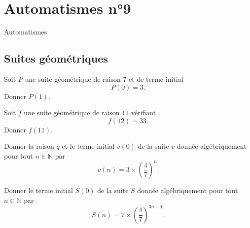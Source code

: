 \documentclass[14pt]{beamer}
\newcommand{\N}{\mathbb{N}}
\begin{document}
\section{Automatismes n°9}

\begin{frame}

\centering \huge
Automatismes

\end{frame}

\subsection{Suites géométriques}

\begin{frame}{1}
    Soit $P$ une suite géométrique de raison $7$ et de terme initial
        \[ P(0) = 3. \]
    Donner $P(1)$.
\end{frame}

\begin{frame}{2}
    Soit $f$ une suite géométrique de raison $11$ vérifiant
        \[ f(12) = 33. \]
    Donner $f(11)$.
\end{frame}

\begin{frame}{3}
	Donner la raison $q$ et le terme initial $v(0)$ de la suite $v$ donnée algébriquement pour tout $n\in\N$ par 
		\[ v(n) = 3 \times \left( \dfrac47 \right)^n. \]
\end{frame}

\begin{frame}{4}
	Donner le terme initial $S(0)$ de la suite $S$ donnée algébriquement pour tout $n\in\N$ par 
		\[ S(n) = 7 \times \left( \dfrac47 \right)^{3n+1}. \]
\end{frame}
\end{document}
